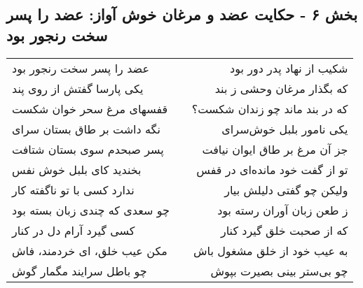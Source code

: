 \begin{center}
\section*{بخش ۶ - حکایت عضد و مرغان خوش آواز: عضد را پسر سخت رنجور بود}
\label{sec:006}
\begin{longtable}{l p{0.5cm} r}
عضد را پسر سخت رنجور بود
&&
شکیب از نهاد پدر دور بود
\\
یکی پارسا گفتش از روی پند
&&
که بگذار مرغان وحشی ز بند
\\
قفسهای مرغ سحر خوان شکست
&&
که در بند ماند چو زندان شکست؟
\\
نگه داشت بر طاق بستان سرای
&&
یکی نامور بلبل خوش‌سرای
\\
پسر صبحدم سوی بستان شتافت
&&
جز آن مرغ بر طاق ایوان نیافت
\\
بخندید کای بلبل خوش نفس
&&
تو از گفت خود مانده‌ای در قفس
\\
ندارد کسی با تو ناگفته کار
&&
ولیکن چو گفتی دلیلش بیار
\\
چو سعدی که چندی زبان بسته بود
&&
ز طعن زبان آوران رسته بود
\\
کسی گیرد آرام دل در کنار
&&
که از صحبت خلق گیرد کنار
\\
مکن عیب خلق، ای خردمند، فاش
&&
به عیب خود از خلق مشغول باش
\\
چو باطل سرایند مگمار گوش
&&
چو بی‌ستر بینی بصیرت بپوش
\\
\end{longtable}
\end{center}
